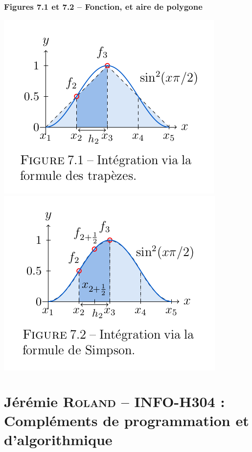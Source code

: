 \documentclass[12pt, a4paper]{article}
\begin{document}
\subsubsection{Figures 7.1 et 7.2 -- Fonction, et aire de polygone}
\begin{center}
\includegraphics[scale=0.4]{images/MATH-H202_Figure_7_1}\includegraphics[scale=0.4]{images/MATH-H202_Figure_7_2}
\end{center}


\section{Jérémie \textsc{Roland} -- INFO-H304 : Compléments de programmation et d'algorithmique}
\end{document}
